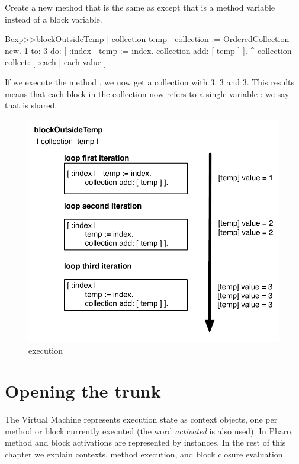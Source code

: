 \documentclass[a4paper,10pt,twoside]{book}
\begin{document}
Create a new method that is the same as  except that is a method variable instead of a block variable.

\begin{code}{}
Bexp>>blockOutsideTemp
	| collection temp |
	collection := OrderedCollection new.
	1 to: 3 do: [ :index | 
		temp := index.
		collection add: [ temp ] ].
	^ collection collect: [ :each | each value ]
\end{code}

If we execute the method , we now get a collection with 3, 3 and 3. This results means that each block in the collection now refers to a single variable : we say that  is shared.

\begin{figure}
	\centering
		\includegraphics[width=0.7\linewidth]{blockClosureOutsideTemp}
	\caption{ execution}
	\label{fig:blockClosureOutsideTemp}
\end{figure}

\section{Opening the trunk}

The Virtual Machine represents execution state as context objects, one per method or block currently executed (the word \emph{activated} is also used). In Pharo, method and block activations are represented by  instances.
In the rest of this chapter we explain contexts, method execution, and block closure evaluation.
\end{document}

